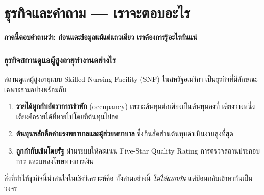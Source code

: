 \documentclass[11pt,a4paper]{article}
\newcommand{\en}[1]{#1}
\begin{document}
\clearpage

\part{ธุรกิจและคำถาม — เราจะตอบอะไร}

\textbf{ภาคนี้ตอบคำถามว่า: ก่อนแตะข้อมูลแม้แต่แถวเดียว เราต้องการรู้อะไรกันแน่}

\section{ธุรกิจสถานดูแลผู้สูงอายุทำงานอย่างไร}

สถานดูแลผู้สูงอายุแบบ \en{Skilled Nursing Facility} (SNF) ในสหรัฐอเมริกา
เป็นธุรกิจที่มีลักษณะเฉพาะสามอย่างพร้อมกัน

\begin{enumerate}
\item \textbf{รายได้ผูกกับอัตราการเข้าพัก} (occupancy) เพราะต้นทุนต่อเตียงเป็นต้นทุนคงที่
      เตียงว่างหนึ่งเตียงคือรายได้ที่หายไปโดยที่ต้นทุนไม่ลด
\item \textbf{ต้นทุนหลักคือค่าแรงพยาบาลและผู้ช่วยพยาบาล} ซึ่งกินสัดส่วนต้นทุนดำเนินงานสูงที่สุด
\item \textbf{ถูกกำกับเข้มโดยรัฐ} ผ่านระบบให้คะแนน \en{Five-Star Quality Rating}
      การตรวจสถานประกอบการ และบทลงโทษทางการเงิน
\end{enumerate}

สิ่งที่ทำให้ธุรกิจนี้น่าสนใจในเชิงวิเคราะห์คือ ทั้งสามอย่างนี้ \emph{ไม่ได้แยกกัน}
แต่ป้อนกลับเข้าหากันเป็นวงจร
\end{document}
